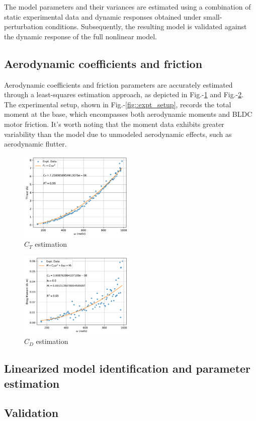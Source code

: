The model parameters and their variances are estimated using a combination of static experimental data and dynamic responses obtained under small-perturbation conditions. Subsequently, the resulting model is validated against the dynamic response of the full nonlinear model.

\subsection{Aerodynamic coefficients and friction}
Aerodynamic coefficients and friction parameters are accurately estimated
through a least-squares estimation approach, as depicted in Fig.-\ref{fig::CT}
and Fig.-\ref{fig::CD}. The experimental setup, shown in
Fig.-\ref{fig::expt_setup}, records the total moment at the base, which
encompasses both aerodynamic moments and BLDC motor friction. It's worth noting
that the moment data exhibits greater variability than the model due to
unmodeled aerodynamic effects, such as aerodynamic flutter.
\begin{multicols}{2}
\begin{figure}[H]
    \centering
    \includegraphics[width = 0.49\textwidth]{Part2/figs/3_figs/aero/Thrust_curve.png}
\caption{$C_T$ estimation}
\label{fig::CT}
\end{figure}
\begin{figure}[H]
    \centering
    \includegraphics[width = 0.49\textwidth]{Part2/figs/3_figs/aero/Drag_curve.png}
    \caption{$C_D$ estimation}
    \label{fig::CD}
\end{figure}
\end{multicols}
\subsection{Linearized model identification and parameter estimation}

\subsection{Validation}

